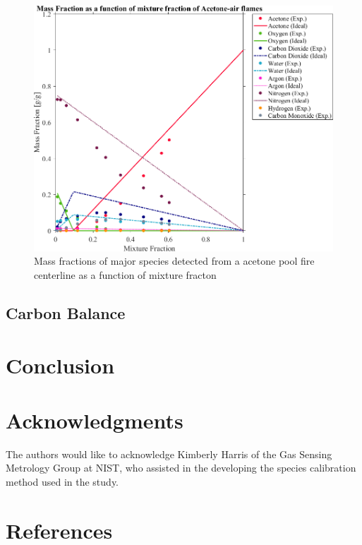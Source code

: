 \documentclass[12pt]{article}
\begin{document}
\begin{figure}[!]
	\centering
\includegraphics[width=12.0cm,keepaspectratio]{Acetone_Mass_Frac_Mix_Frac.png}
	\caption[Averaged quasi-steady mass fraction of major species as a function of mixture fraction for a acetone pool fire]{Mass fractions of major species detected from a acetone pool fire centerline as a function of mixture fracton}
	\label{fig:Acetone_Mix_Frac}
\end{figure}


\subsection{Carbon Balance}
\label{ssec:Carbon Balance}


\section{Conclusion}
\label{sec:Conclusion}

\section*{Acknowledgments}
\noindent The authors would like to acknowledge Kimberly Harris of the Gas Sensing Metrology Group at NIST, who assisted in the developing the species calibration method used in the study.

\pagebreak

\section*{References}


\end{document}
